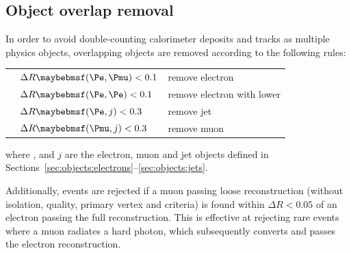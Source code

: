 \subsection{Object overlap removal}
\label{sec:objects:overlap}

In order to avoid double-counting calorimeter deposits and tracks as multiple physics 
objects, overlapping objects are removed according to the following rules:

\begin{listliketab}
	\begin{tabular}{Ll@{\hskip 0.3in}l}
		\textbullet & $\Delta R \parenths{\Pe,\Pmu} < 0.1$ & remove electron \\
		\textbullet & $\Delta R \parenths{\Pe,\Pe}  < 0.1$ & remove electron with lower \pt \\
		\textbullet & $\Delta R \parenths{\Pe,j}    < 0.3$ & remove jet \\
		\textbullet & $\Delta R \parenths{\Pmu,j}   < 0.3$ & remove muon \\
	\end{tabular}
\end{listliketab}

\noindent
where \Pe, \Pmu and $j$ are the electron, muon and jet objects defined in 
Sections~\ref{sec:objects:electrons}--\ref{sec:objects:jets}.

Additionally, events are rejected if a muon passing loose reconstruction (\ie without 
isolation, quality, primary vertex and \pt criteria) is found within $\Delta R < 0.05$ of 
an electron passing the full reconstruction. 
This is effective at rejecting rare \HepProcess{\PZ \HepTo \Pmu\Pmu} events where a muon 
radiates a hard photon, which subsequently converts and passes the electron reconstruction.

